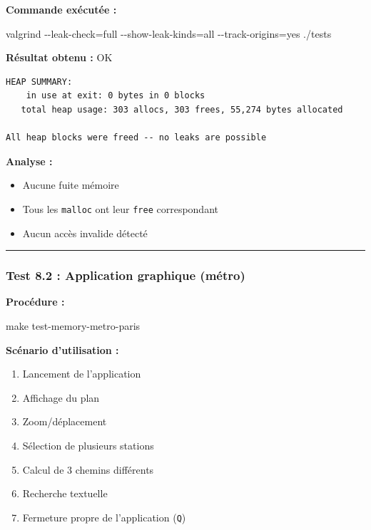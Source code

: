 \documentclass[
]{article}
\newcommand{\OK}{OK~\twemoji{white_check_mark}}
\newcommand{\OK}{OK~\twemoji{white_check_mark}}
\newenvironment{Shaded}{}{}
\newcommand{\AttributeTok}[1]{\textcolor[rgb]{0.49,0.56,0.16}{#1}}
\newcommand{\FunctionTok}[1]{\textcolor[rgb]{0.02,0.16,0.49}{#1}}
\newcommand{\NormalTok}[1]{#1}
\newcommand{\OperatorTok}[1]{\textcolor[rgb]{0.40,0.40,0.40}{#1}}
\providecommand{\tightlist}{%
  \setlength{\itemsep}{0pt}\setlength{\parskip}{0pt}}
\begin{document}
\textbf{Commande exécutée :}

\begin{Shaded}
\begin{Highlighting}[]
\FunctionTok{valgrind} \AttributeTok{{-}{-}leak{-}check}\OperatorTok{=}\NormalTok{full }\AttributeTok{{-}{-}show{-}leak{-}kinds}\OperatorTok{=}\NormalTok{all }\AttributeTok{{-}{-}track{-}origins}\OperatorTok{=}\NormalTok{yes ./tests}
\end{Highlighting}
\end{Shaded}

\textbf{Résultat obtenu :} \OK

\begin{verbatim}
HEAP SUMMARY:
    in use at exit: 0 bytes in 0 blocks
   total heap usage: 303 allocs, 303 frees, 55,274 bytes allocated

All heap blocks were freed -- no leaks are possible
\end{verbatim}

\textbf{Analyse :}

\begin{itemize}
\tightlist
\item
  Aucune fuite mémoire
\item
  Tous les \texttt{malloc} ont leur \texttt{free} correspondant
\item
  Aucun accès invalide détecté
\end{itemize}

\begin{center}\rule{0.5\linewidth}{0.5pt}\end{center}

\subsubsection{Test 8.2 : Application graphique
(métro)}\label{test-8.2-application-graphique-muxe9tro}

\textbf{Procédure :}

\begin{Shaded}
\begin{Highlighting}[]
\FunctionTok{make}\NormalTok{ test{-}memory{-}metro{-}paris}
\end{Highlighting}
\end{Shaded}

\textbf{Scénario d'utilisation :}

\begin{enumerate}
\def\labelenumi{\arabic{enumi}.}
\tightlist
\item
  Lancement de l'application
\item
  Affichage du plan
\item
  Zoom/déplacement
\item
  Sélection de plusieurs stations
\item
  Calcul de 3 chemins différents
\item
  Recherche textuelle
\item
  Fermeture propre de l'application (\texttt{Q})
\end{enumerate}
\end{document}
